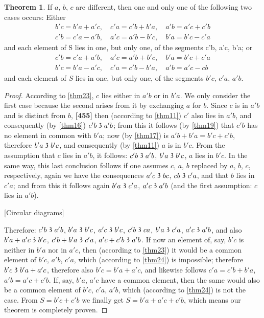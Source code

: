 \documentclass[leqno]{article}
\theoremstyle{definition}
\newtheorem{theorem}{Theorem}
\newcommand\partof{\mathrel{\raisebox{0.45ex}{$\mathfrak{3}$}}}
\begin{document}
\begin{theorem}\label{thm25}
If $a$, $b$, $c$ are different, then one and only one of the following two cases occurs: Either
\begin{multline}
b'c=b'a+a'c,\quad c'a =c'b+b'a,\quad a'b = a'c+c'b \\
c'b=c'a-a'b,\quad a'c=a'b-b'c,\quad b'a=b'c-c'a
\end{multline}
and each element of S lies in one, but only one, of the segments c'b, a'c, b'a; or
\begin{multline}
c'b=c'a+a'b,\quad a'c=a'b+b'c,\quad b'a=b'c + c'a \\
b'c=b'a-a'c,\quad c'a=c'b-b'a,\quad a'b=a'c-cb
\end{multline}
and each element of $S$ lies in one, but only one, of the segments $b'c$, $c'a$, $a'b$.\end{theorem}

\begin{proof}
According to \ref{thm23}, $c$ lies either in $a'b$ or in $b'a$. We only consider the first case because the second arises from it by exchanging $a$ for $b$. 
Since $c$ is in $a'b$ and is distinct from $b$, \textbf{[455]} then (according to \ref{thm11}) $c'$ also lies in $a'b$, and consequently (by \ref{thm16}) $c'b \partof a'b$; from this it follows (by \ref{thm19}) that $c'b$ has no element in common with $b'a$; now (by \ref{thm17}) is $a'b+b'a=b'c+c'b$, therefore $b'a \partof b'c$, and consequently (by \ref{thm11}) $a$ is in $b'c$. 
From the assumption that $c$ lies in $a'b$, it follows: $c'b \partof a'b$, $b'a \partof b'c$, $a$ lies in $b'c$. 
In the same way, this last conclusion follows if one assumes $c$, $a$, $b$ replaced by $a$, $b$, $c$, respectively, again we have the consequences $a'c \partof bc$, $cb \partof c'a$, and that $b$ lies in $c'a$; and from this it follows again $b'a \partof c'a$, $a'c \partof a'b$ (and the first assumption: $c$ lies in $a'b$).

\bigskip

[Circular diagrams]

\bigskip

Therefore: $c'b \partof a'b$, $b'a \partof b'c$, $a'c \partof b'c$, $c'b \partof ca$, $b'a \partof c'a$, $a'c \partof a'b$, and also $b'a + a'c \partof b'c$, $c'b + b'a \partof c'a$, $a'c + c'b \partof a'b$. 
If now an element of, say, $b'c$ is neither in $b'a$ nor in $a'c$, then (according to \ref{thm23}) it would be a common element of $b'c$, $a'b$, $c'a$, which (according to \ref{thm24}) is impossible; therefore $b'c \partof b'a + a'c$, therefore also $b'c=b'a + a'c$, and likewise follows $c'a=c'b+b'a$, $a'b=a'c+c'b$. If, say, $b'a$, $a'c$ have a common element, then the same would also be a common element of $b'c$, $c'a$, $a'b$, which (according to \ref{thm24}) is not the case. 
From $S=b'c+c'b$ we finally get $S=b'a+a'c+c'b$, which means our theorem is completely proven.
\end{proof}
\end{document}
